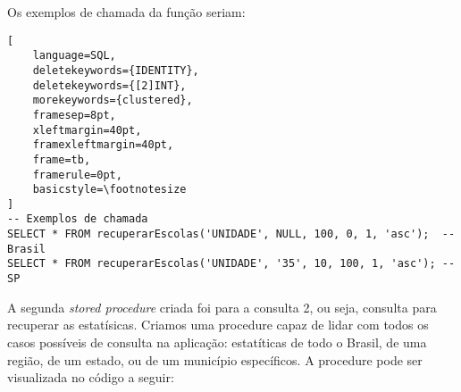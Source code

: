 \documentclass[12pt,a4paper]{article}
\begin{document}
\vspace{0.5cm}

Os exemplos de chamada da função seriam:

\begin{lstlisting}[ 
    language=SQL,
    deletekeywords={IDENTITY},
    deletekeywords={[2]INT},
    morekeywords={clustered},
    framesep=8pt,
    xleftmargin=40pt,
    framexleftmargin=40pt,
    frame=tb,
    framerule=0pt,
    basicstyle=\footnotesize
]
-- Exemplos de chamada
SELECT * FROM recuperarEscolas('UNIDADE', NULL, 100, 0, 1, 'asc');  -- Brasil
SELECT * FROM recuperarEscolas('UNIDADE', '35', 10, 100, 1, 'asc'); -- SP
\end{lstlisting}


\vspace{0.5cm}
A segunda \textit{stored procedure} criada foi para a consulta 2, ou seja, consulta para recuperar as estatísicas. Criamos uma procedure capaz de lidar com todos os casos possíveis de consulta na aplicação: estatíticas de todo o Brasil, de uma região, de um estado, ou de um município específicos. A procedure pode ser visualizada no código a seguir:

\vspace{0.5cm}
\end{document}
